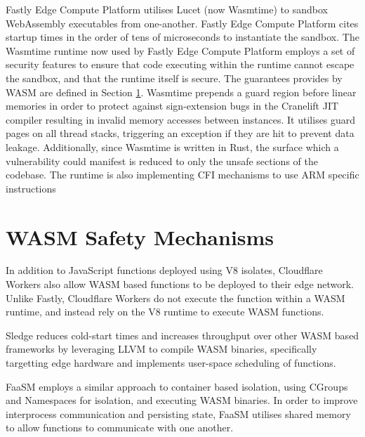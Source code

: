 Fastly Edge Compute Platform\cite{EdgeCloudPlatform} utilises Lucet\cite{BytecodeallianceLucet2024} (now Wasmtime\cite{Wasmtime}) to sandbox WebAssembly executables from one-another. Fastly Edge Compute Platform cites startup times in the order of tens of microseconds to instantiate the sandbox. The Wasmtime runtime now used by Fastly Edge Compute Platform employs a set of security features to ensure that code executing within the runtime cannot escape the sandbox, and that the runtime itself is secure\cite{SecurityWasmtime}. The guarantees provides by WASM are defined in Section \ref{sec:wasm-safety-mechanisms}. Wasmtime prepends a guard region before linear memories in order to protect against sign-extension bugs in the Cranelift JIT compiler resulting in invalid memory accesses between instances. It utilises guard pages on all thread stacks, triggering an exception if they are hit to prevent data leakage. Additionally, since Wasmtime is written in Rust, the surface which a vulnerability could manifest is reduced to only the unsafe sections of the codebase. The runtime is also implementing CFI mechanisms to use ARM specific instructions

\section{WASM Safety Mechanisms}
\label{sec:wasm-safety-mechanisms}

In addition to JavaScript functions deployed using V8 isolates, Cloudflare Workers\cite{CloudComputingContainers2018} also allow WASM based functions to be deployed to their edge network. Unlike Fastly, Cloudflare Workers do not execute the function within a WASM runtime, and instead rely on the V8 runtime to execute WASM functions\cite{WebAssemblyWasmCloudflare2024}.

Sledge reduces cold-start times and increases throughput over other WASM based \faas{} frameworks by leveraging LLVM to compile WASM binaries, specifically targetting edge hardware and implements user-space scheduling of functions\cite{gadepalliSledgeServerlessfirstLightweight2020}.

FaaSM employs a similar approach to container based isolation, using CGroups and Namespaces for isolation, and executing WASM binaries. In order to improve interprocess communication and persisting state, FaaSM utilises shared memory to allow functions to communicate with one another\cite{shillakerFaasmLightweightIsolation2020}.

